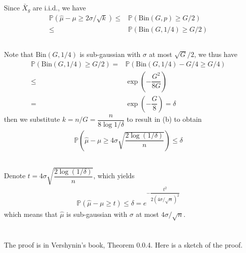 \documentclass[11pt,a4paper]{article}
\numberwithin{equation}{section}%
\begin{document}
Since $ \bar{X}_g $ are i.i.d., we have
\begin{align*}
    \mathbb{P}\left( \hat{\mu }-\mu \geq 2\sigma /\sqrt{k} \right) \leq & \mathbb{P}\left( \mathrm{Bin}(G,p) \geq G/2 \right)\\
    \leq & \mathbb{P}\left( \mathrm{Bin}(G,1/4) \geq G/2 \right) 
\end{align*}


\subsection{}
Note that $ \mathrm{ Bin }(G,1/4)  $ is sub-gaussian with $ \sigma  $ at most $ \sqrt{G}/2 $, we thus have
\begin{align*}
    \mathbb{P}\left( \mathrm{Bin}(G,1/4) \geq G/2 \right) =& \mathbb{P}\left( \mathrm{Bin}(G,1/4) -G/4 \geq G/4 \right)\\
    \leq & \exp\left( -\dfrac{ G^2 }{ 8G } \right)\\
    =& \exp\left( -\dfrac{ G }{ 8 } \right) = \delta 
\end{align*}
then we substitute $ k=n/G = \dfrac{ n  }{ 8\log 1/\delta  }  $ to result in (b) to obtain
\begin{align*}
    \mathbb{P}\left( \hat{\mu } -\mu \geq 4\sigma \sqrt{\dfrac{ 2\log (1/\delta ) }{ n } } \right) \leq \delta  
\end{align*}

\subsection{}
Denote $ t = 4\sigma \sqrt{\dfrac{ 2\log (1/\delta ) }{ n } }  $, which yields
\begin{align*}
    \mathbb{P}\left( \hat{\mu } -\mu \geq t \right) \leq \delta = e^{-\dfrac{ t^2 }{ 2 (4\sigma /\sqrt{n})^2 } } 
\end{align*}
which means that $ \hat{\mu } $ is sub-gaussian with $ \sigma  $ at most $ 4\sigma /\sqrt{n} $.



\section{}
The proof is in Vershynin's book, Theorem 0.0.4. Here is a sketch of the proof.
\end{document}
